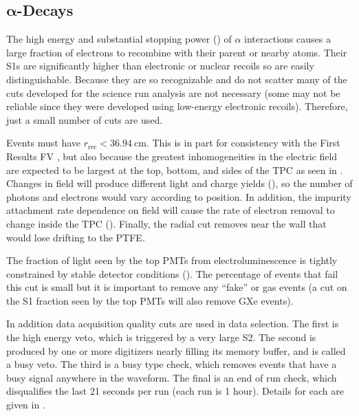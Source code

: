 \subsection[$\alpha$-Decays][$\alpha$-Decays]{$\mathbf{\alpha}$-Decays}
\label{subsec:electron_lifetimes_measurement_alphas}
The high energy and substantial stopping power () of $\alpha$ interactions causes a large fraction of
electrons to recombine with their parent or nearby  atoms.  Their S1s are significantly higher than electronic or nuclear recoils
so are
easily distinguishable.  Because they are so recognizable and do not scatter many of the cuts developed for the science run analysis are
not necessary (some may not be reliable since they were developed using low-energy electronic recoils).  Therefore, just a small
number of cuts are used.

Events must have $r_{\mathrm{rec}} < 36.94\ \mathrm{cm}$.  This is in part for consistency with the First Results FV
, but also because the greatest inhomogeneities in the electric field are expected to be largest at the top,
bottom, and
sides of the TPC as seen in .  Changes in field will produce different light and charge yields
(), so the number of photons and electrons would vary according to position.  In addition, the impurity
attachment rate dependence on field will cause the rate of electron removal to change inside the TPC
().  Finally, the radial cut removes \alphadecays near the wall that would lose drifting
\electron to the PTFE.

The fraction of light seen by the top PMTs from electroluminescence is tightly constrained by stable detector conditions
().  The percentage of events that fail this cut is small but it is important to remove any
``fake'' or gas events (a cut on the S1 fraction seen by the top PMTs will also remove GXe events).

In addition data acquisition quality cuts are used in data selection.  The first is the high energy veto, which is triggered by a very
large S2.  The second is produced by one or more digitizers nearly filling its memory buffer, and is called a busy veto.  The third is
a busy type check, which removes events that have a busy signal anywhere in the waveform.  The final is an end of run check, which
disqualifies the last 21 seconds per run (each run is 1 hour).  Details for each are given in .

